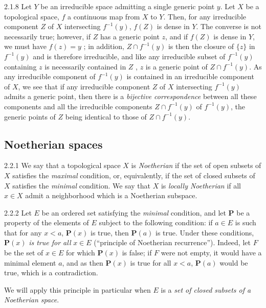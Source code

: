 \begin{env}{2.1.8}
\label{env-0.2.1.8}
Let $Y$ be an irreducible space admitting a single generic point $y$. Let $X$ be a
topological space, $f$ a continuous map from $X$ to $Y$. Then, for any irreducible
component $Z$ of $X$ intersecting $f^{-1}(y)$, $f(Z)$ is dense in $Y$. The converse is not
necessarily true; however, if $Z$ has a generic point $z$, and if $f(Z)$ is dense in $Y$, we
must have $f(z)=y$ ; in addition, $Z\cap f^{-1}(y)$ is then the closure of
$\{z\}$ in $f^{-1}(y)$ and is therefore irreducible, and like any irreducible subset of
$f^{-1}(y)$ containing $z$ is necessarily contained in $Z$ , $z$ is a
generic point of $Z\cap f^{-1}(y)$. As any irreducible component of $f^{-1}(y)$ is contained
in an irreducible component of $X$, we see that if any irreducible component $Z$ of $X$
intersecting $f^{-1}(y)$ admits a generic point, then there is a \emph{bijective
correspondence} between all these components and all the irreducible components
$Z\cap f^{-1}(y)$ of $f^{-1}(y)$, the generic points of $Z$ being identical to those of
$Z\cap f^{-1}(y)$.
\end{env}

\subsection{Noetherian spaces}
\label{0-prelim-2.2}

\begin{env}{2.2.1}
\label{env-0.2.2.1}
We say that a topological space $X$ is \emph{Noetherian} if the set of open subsets of $X$
satisfies the \emph{maximal} condition, or, equivalently, if the set of closed subsets of $X$
satisfies the \emph{minimal} condition. We say that $X$ is \emph{locally Noetherian} if all
$x\in X$ admit a neighborhood which is a Noetherian subspace.
\end{env}

\begin{env}{2.2.2}
\label{env-0.2.2.2}
Let $E$ be an ordered set satisfying the \emph{minimal} condition, and let $\mathbf{P}$ be a
property of the elements of $E$ subject to the following condition: if $a\in E$ is such that
for any $x<a$, $\mathbf{P}(x)$ is true, then $\mathbf{P}(a)$ is true. Under these conditions,
$\mathbf{P}(x)$ \emph{is true for all} $x\in E$ (``principle of Noetherian recurrence'').
Indeed, let $F$ be the set of $x\in E$ for which $\mathbf{P}(x)$ is false; if $F$ were not
empty, it would have a minimal element $a$, and as then $\mathbf{P}(x)$ is true for all
$x<a$, $\mathbf{P}(a)$ would be true, which is a contradiction.

We will apply this principle in particular when $E$ is a \emph{set of closed subsets of a
Noetherian space}.
\end{env}

